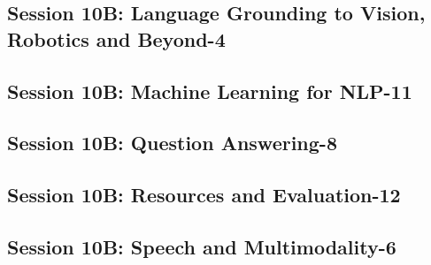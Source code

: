 \subsection{\large Session 10B: Language Grounding to Vision, Robotics and Beyond-4}
\label{parallel-session-10B-trackD}
\TrackDLoc\hfill\sessionchair{}{}
\clearpage
\subsection{\large Session 10B: Machine Learning for NLP-11}
\label{parallel-session-10B-trackE}
\TrackELoc\hfill\sessionchair{}{}
\clearpage
\subsection{\large Session 10B: Question Answering-8}
\label{parallel-session-10B-trackF}
\TrackFLoc\hfill\sessionchair{}{}
\clearpage
\subsection{\large Session 10B: Resources and Evaluation-12}
\label{parallel-session-10B-trackG}
\TrackGLoc\hfill\sessionchair{}{}
\clearpage
\subsection{\large Session 10B: Speech and Multimodality-6}
\label{parallel-session-10B-trackH}
\TrackHLoc\hfill\sessionchair{}{}
\clearpage
